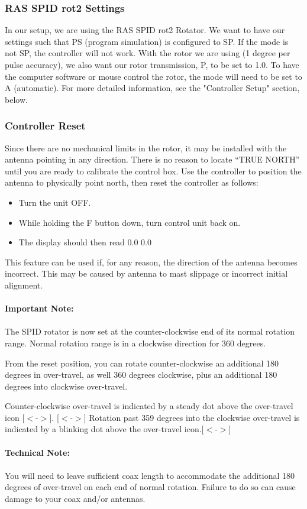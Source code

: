 \documentclass[11pt]{article} %
\begin{document}
\subsubsection{RAS SPID rot2 Settings}

In our setup, we are using the RAS SPID rot2 Rotator. We want to have our settings such that PS (program simulation) is configured to SP. If the mode is not SP, the controller will not work. With the rotor we are using (1 degree per pulse accuracy), we also want our rotor transmission, P, to be set to 1.0. To have the computer software or mouse control the rotor, the mode will need to be set to A (automatic). For more detailed information, see the "Controller Setup" section, below.

\subsubsection{Controller Reset}

Since there are no mechanical limits in the rotor, it may be installed with the antenna pointing in any direction. There is no reason to locate “TRUE NORTH” until you are ready to calibrate the control box. Use the controller to position the antenna to physically point north, then reset the controller as follows:
\begin{itemize}
\item Turn the unit OFF.
\item While holding the F button down, turn control unit back on.
\item The display should then read 0.0 0.0
\end{itemize}

This feature can be used if, for any reason, the direction of the antenna becomes incorrect. This may be caused by antenna to mast slippage or incorrect initial alignment.
\\ \\
\textbf{Important Note:}
\\ \\
The SPID rotator is now set at the counter-clockwise end of its normal rotation range. Normal rotation range is in a clockwise direction for 360 degrees.

From the reset position, you can rotate counter-clockwise an additional 180 degrees in over-travel, as well 360 degrees clockwise, plus an additional 180 degrees into clockwise over-travel.

Counter-clockwise over-travel is indicated by a steady dot above the over-travel icon [$<$-$>$]. [$<$-$>$] Rotation past 359 degrees into the clockwise over-travel is indicated by a blinking dot above the over-travel icon.[$<$-$>$]
\\ \\
\textbf{Technical Note:}
\\ \\
You will need to leave sufficient coax length to accommodate the additional 180 degrees of over-travel on each end of normal rotation. Failure to do so can cause damage to your coax and/or antennas.
\end{document}

